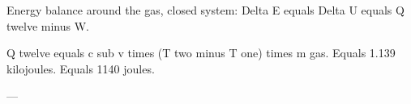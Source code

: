 Energy balance around the gas, closed system:  
Delta E equals Delta U equals Q twelve minus W.  

Q twelve equals c sub v times (T two minus T one) times m gas.  
Equals 1.139 kilojoules.  
Equals 1140 joules.  

---